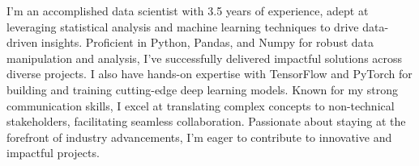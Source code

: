 \raggedright{

I'm an accomplished data scientist with 3.5 years of experience, adept at leveraging statistical analysis and machine learning techniques to drive data-driven insights. Proficient in Python, Pandas, and Numpy for robust data manipulation and analysis, I've successfully delivered impactful solutions across diverse projects. I also have hands-on expertise with TensorFlow and PyTorch for building and training cutting-edge deep learning models. Known for my strong communication skills, I excel at translating complex concepts to non-technical stakeholders, facilitating seamless collaboration. Passionate about staying at the forefront of industry advancements, I'm eager to contribute to innovative and impactful projects.
}

